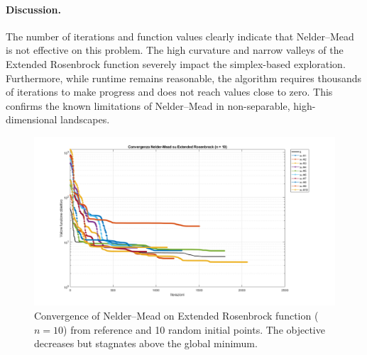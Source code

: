 \documentclass[a4paper,12pt]{article}
\begin{document}
	\vspace{0.5em}
	
	\begin{table}[htbp]
		\centering
		\caption{Results of Nelder–Mead on Extended Rosenbrock function.}
		\renewcommand{\arraystretch}{1.2}
		\label{tab:nelder_rosenbrock}
	\end{table}
	
	\paragraph{Discussion.}
	The number of iterations and function values clearly indicate that Nelder–Mead is not effective on this problem. The high curvature and narrow valleys of the Extended Rosenbrock function severely impact the simplex-based exploration. Furthermore, while runtime remains reasonable, the algorithm requires thousands of iterations to make progress and does not reach values close to zero. This confirms the known limitations of Nelder–Mead in non-separable, high-dimensional landscapes.
	
	\begin{figure}[htbp]
		\centering
		\includegraphics[width=\textwidth]{../immagini/ext_10.png}
		\caption{Convergence of Nelder–Mead on Extended Rosenbrock function ($n=10$) from reference and 10 random initial points. The objective decreases but stagnates above the global minimum.}
		\label{fig:nelder_rosen_10}
	\end{figure}
	
\end{document}
